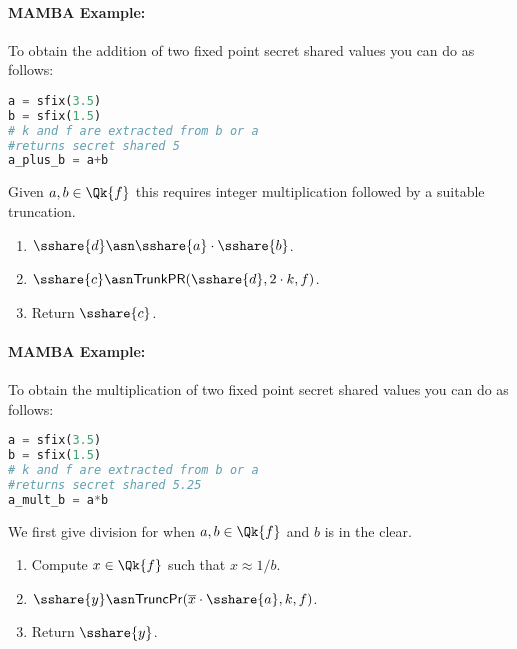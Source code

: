 \paragraph{MAMBA Example:} To obtain the addition of two fixed point secret shared values you can do as follows:
\begin{lstlisting}[language={python}]
a = sfix(3.5)
b = sfix(1.5)
# k and f are extracted from b or a
#returns secret shared 5
a_plus_b = a+b
\end{lstlisting}
Given $a, b \in \Qk{f}$ this requires integer multiplication followed
by a suitable truncation.
\begin{enumerate}
\item $\sshare{d} \asn \sshare{a} \cdot \sshare{b}$.
\item $\sshare{c} \asn \mathsf{TrunkPR}(\sshare{d},2 \cdot k,f)$.
\item Return $\sshare{c}$.
\end{enumerate}
\paragraph{MAMBA Example:} To obtain the multiplication of two fixed point secret shared values you can do as follows:
\begin{lstlisting}[language={python}]
a = sfix(3.5)
b = sfix(1.5)
# k and f are extracted from b or a
#returns secret shared 5.25
a_mult_b = a*b
\end{lstlisting}

We first give division for when $a, b \in \Qk{f}$ and $b$ is in the clear.
\begin{enumerate}
\item Compute $x \in \Qk{f}$ such that $x \approx 1/b$.
\item $\sshare{y} \asn \mathsf{TruncPr}(\overline{x} \cdot \sshare{a},k,f)$.
\item Return $\sshare{y}$.
\end{enumerate}

